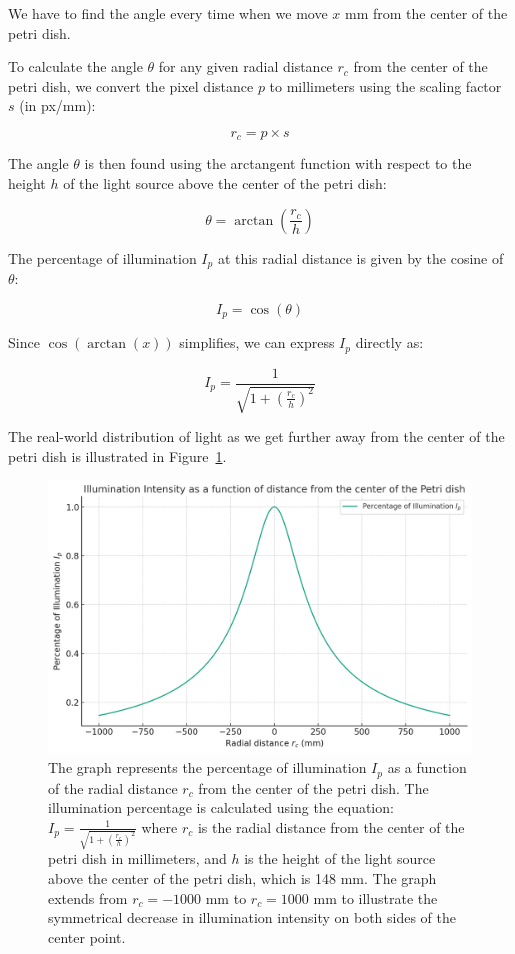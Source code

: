 We have to find the angle every time when we move \( x \) mm from the center of the petri dish.

To calculate the angle \( \theta \) for any given radial distance \( r_c \) from the center of the petri dish, we convert the pixel distance \( p \) to millimeters using the scaling factor \( s \) (in px/mm):

\[ r_c = p \times s \]

The angle \( \theta \) is then found using the arctangent function with respect to the height \( h \) of the light source above the center of the petri dish:

\[ \theta = \arctan\left(\frac{r_c}{h}\right) \]

The percentage of illumination \( I_p \) at this radial distance is given by the cosine of \( \theta \):

\[ I_p = \cos(\theta) \]

Since \( \cos(\arctan(x)) \) simplifies, we can express \( I_p \) directly as:

\[ I_p = \frac{1}{\sqrt{1 + \left(\frac{r_c}{h}\right)^2}} \]

The real-world distribution of light as we get further away from the center of the petri dish is illustrated in Figure~\ref{fig:illumination-percentage}.

\begin{figure}
    \centering
    \includegraphics[width=1\linewidth]{images/831353b8-f4b4-4a93-9c41-ba3d6b6f5811.jpg}
    \caption{The graph represents the percentage of illumination $I_p$ as a function of the radial distance $r_c$ from the center of the petri dish. The illumination percentage is calculated using the equation:$I_p = \frac{1}{\sqrt{1 + \left(\frac{r_c}{h}\right)^2}}$
    where \( r_c \) is the radial distance from the center of the petri dish in millimeters, and \( h \) is the height of the light source above the center of the petri dish, which is 148 mm. The graph extends from \( r_c = -1000 \) mm to \( r_c = 1000 \) mm to illustrate the symmetrical decrease in illumination intensity on both sides of the center point.}
    \label{fig:illumination-percentage}
\end{figure}



